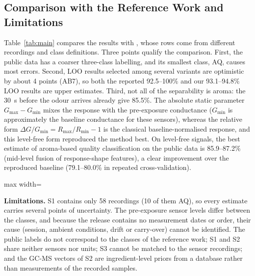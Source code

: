 \subsection{Comparison with the Reference Work and Limitations}

Table~\ref{tab:main} compares the results with \cite{rodriguez2010electronic}, whose rows come from different recordings and class definitions. Three points qualify the comparison. First, the public data has a coarser three-class labelling, and its smallest class, AQ, causes most errors. Second, LOO results selected among several variants are optimistic by about 4 points (AB7), so both the reported 92.5--100\% and our 93.1--94.8\% LOO results are upper estimates. Third, not all of the separability is aroma: the 30~s before the odour arrives already give 85.5\%. The absolute static parameter $G_{\max} - G_{\min}$ mixes the response with the pre-exposure conductance ($G_{\min}$ is approximately the baseline conductance for these sensors), whereas the relative form $\Delta G/G_{\min} = R_{\max}/R_{\min} - 1$ is the classical baseline-normalised response, and this level-free form reproduced the method best. On level-free signals, the best estimate of aroma-based quality classification on the public data is 85.9--87.2\% (mid-level fusion of response-shape features), a clear improvement over the reproduced baseline (79.1--80.0\% in repeated cross-validation).

\begin{table}[!htbp]
\centering
\caption[Comparison with the reference work]{Comparison with the reference work. For S1, the accuracy is given as LOO / repeated five-fold cross-validation.}
\label{tab:main}
\footnotesize
\begin{adjustbox}{max width=\textwidth}

\end{adjustbox}
\end{table}

\textbf{Limitations.} S1 contains only 58 recordings (10 of them AQ), so every estimate carries several points of uncertainty. The pre-exposure sensor levels differ between the classes, and because the release contains no measurement dates or order, their cause (session, ambient conditions, drift or carry-over) cannot be identified. The public labels do not correspond to the classes of the reference work; S1 and S2 share neither sensors nor units; S3 cannot be matched to the sensor recordings; and the GC-MS vectors of S2 are ingredient-level priors from a database rather than measurements of the recorded samples.
\clearpage

